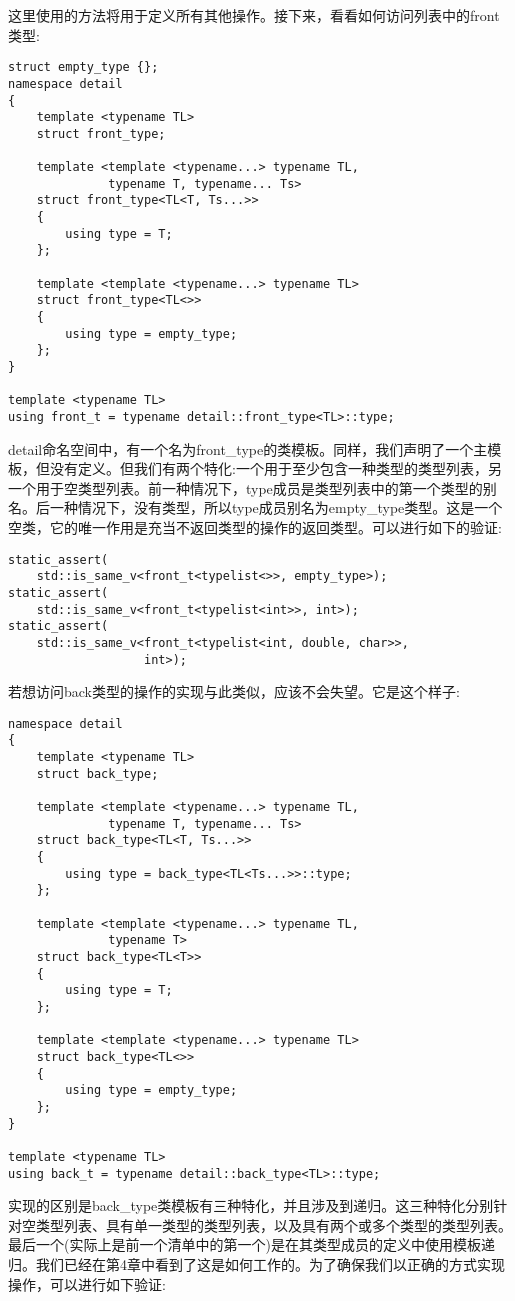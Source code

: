这里使用的方法将用于定义所有其他操作。接下来，看看如何访问列表中的front类型:

\begin{lstlisting}[style=styleCXX]
struct empty_type {};
namespace detail
{
	template <typename TL>
	struct front_type;
	
	template <template <typename...> typename TL,
			  typename T, typename... Ts>
	struct front_type<TL<T, Ts...>>
	{
		using type = T;
	};

	template <template <typename...> typename TL>
	struct front_type<TL<>>
	{
		using type = empty_type;
	};
}

template <typename TL>
using front_t = typename detail::front_type<TL>::type;
\end{lstlisting}

detail命名空间中，有一个名为front\_type的类模板。同样，我们声明了一个主模板，但没有定义。但我们有两个特化:一个用于至少包含一种类型的类型列表，另一个用于空类型列表。前一种情况下，type成员是类型列表中的第一个类型的别名。后一种情况下，没有类型，所以type成员别名为empty\_type类型。这是一个空类，它的唯一作用是充当不返回类型的操作的返回类型。可以进行如下的验证:

\begin{lstlisting}[style=styleCXX]
static_assert(
	std::is_same_v<front_t<typelist<>>, empty_type>);
static_assert(
	std::is_same_v<front_t<typelist<int>>, int>);
static_assert(
	std::is_same_v<front_t<typelist<int, double, char>>,
				   int>);
\end{lstlisting}

若想访问back类型的操作的实现与此类似，应该不会失望。它是这个样子:

\begin{lstlisting}[style=styleCXX]
namespace detail
{
	template <typename TL>
	struct back_type;
	
	template <template <typename...> typename TL,
			  typename T, typename... Ts>
	struct back_type<TL<T, Ts...>>
	{
		using type = back_type<TL<Ts...>>::type;
	};

	template <template <typename...> typename TL,
	          typename T>
	struct back_type<TL<T>>
	{
		using type = T;
	};

	template <template <typename...> typename TL>
	struct back_type<TL<>>
	{
		using type = empty_type;
	};
}

template <typename TL>
using back_t = typename detail::back_type<TL>::type;
\end{lstlisting}

实现的区别是back\_type类模板有三种特化，并且涉及到递归。这三种特化分别针对空类型列表、具有单一类型的类型列表，以及具有两个或多个类型的类型列表。最后一个(实际上是前一个清单中的第一个)是在其类型成员的定义中使用模板递归。我们已经在第4章中看到了这是如何工作的。为了确保我们以正确的方式实现操作，可以进行如下验证:

